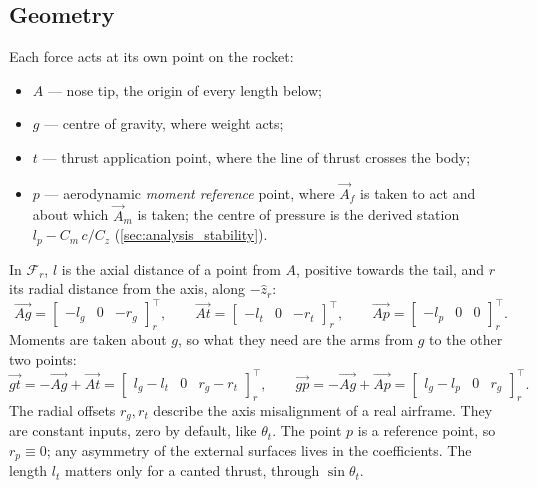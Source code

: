 \subsection{Geometry}\label{sec:geometry}
Each force acts at its own point on the rocket:
\begin{itemize}
    \item $A$ --- nose tip, the origin of every length below;
    \item $g$ --- centre of gravity, where weight acts;
    \item $t$ --- thrust application point, where the line of thrust crosses the body;
    \item $p$ --- aerodynamic \emph{moment reference} point, where $\vec{A}_f$ is taken to act and
    about which $\vec{A}_m$ is taken; the centre of pressure is the derived station
    $l_p - C_m\,c/C_z$ (\autoref{sec:analysis_stability}).
\end{itemize}
In $\mathcal{F}_r$, $l$ is the axial distance of a point from $A$, positive towards the tail, and
$r$ its radial distance from the axis, along $-\hat{z}_r$:
\begin{equation}
    \vec{Ag} = \begin{bmatrix} -l_g & 0 & -r_g \end{bmatrix}^\top_r, \qquad
    \vec{At} = \begin{bmatrix} -l_t & 0 & -r_t \end{bmatrix}^\top_r, \qquad
    \vec{Ap} = \begin{bmatrix} -l_p & 0 & 0 \end{bmatrix}^\top_r.
\end{equation}
Moments are taken about $g$, so what they need are the arms from $g$ to the other two points:
\begin{equation}\label{eq:arms}
    \vec{gt} = -\vec{Ag} + \vec{At} = \begin{bmatrix} l_g-l_t & 0 & r_g-r_t \end{bmatrix}^\top_r, \qquad
    \vec{gp} = -\vec{Ag} + \vec{Ap} = \begin{bmatrix} l_g-l_p & 0 & r_g \end{bmatrix}^\top_r.
\end{equation}
The radial offsets $r_g,r_t$ describe the axis misalignment of a real airframe. They are constant
inputs, zero by default, like $\theta_t$. The point $p$ is a reference point, so $r_p\equiv0$; any
asymmetry of the external surfaces lives in the coefficients. The length $l_t$ matters only for a
canted thrust, through $\sin\theta_t$.


